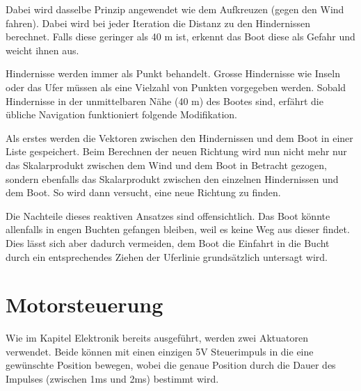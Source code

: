 Dabei wird dasselbe Prinzip angewendet wie dem Aufkreuzen (gegen den Wind fahren). Dabei wird bei jeder Iteration die Distanz zu den Hindernissen berechnet. Falls diese geringer als 40 m ist, erkennt das Boot diese als Gefahr und weicht ihnen aus.  

Hindernisse werden immer als Punkt behandelt. Grosse Hindernisse wie Inseln oder das Ufer müssen als eine Vielzahl von Punkten vorgegeben werden. Sobald Hindernisse in der unmittelbaren Nähe (40 m) des Bootes sind, erfährt die übliche Navigation funktioniert folgende Modifikation.

Als erstes werden die Vektoren zwischen den Hindernissen und dem Boot in einer Liste gespeichert. Beim Berechnen der neuen Richtung wird nun nicht mehr nur das Skalarprodukt zwischen dem Wind und dem Boot in Betracht gezogen, sondern ebenfalls das Skalarprodukt zwischen den einzelnen Hindernissen und dem Boot. So wird dann versucht,  eine neue Richtung zu finden.

Die Nachteile dieses reaktiven Ansatzes sind offensichtlich. Das Boot könnte allenfalls in engen Buchten gefangen bleiben, weil es keine Weg aus dieser findet. Dies lässt sich aber dadurch vermeiden, dem Boot die Einfahrt in die Bucht durch ein entsprechendes Ziehen der Uferlinie grundsätzlich untersagt wird. 

\section{Motorsteuerung}
Wie im Kapitel Elektronik bereits ausgeführt, werden zwei Aktuatoren verwendet. Beide können mit einen einzigen 5V Steuerimpuls in die eine gewünschte Position bewegen, wobei die genaue Position durch die Dauer des Impulses (zwischen 1ms und 2ms) bestimmt wird. 

